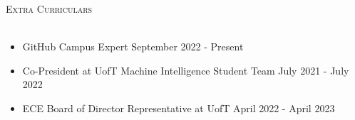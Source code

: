 \documentclass[a4paper]{article}
\newcommand{\lineunder} {
    \vspace*{-8pt} \\
    \hspace*{-18pt} \hrulefill \\
}
\newcommand{\header} [1] {
    {\hspace*{-18pt}\vspace*{6pt} \textsc{#1}}
    \vspace*{-6pt} \lineunder
}
\begin{document}

\vspace{1mm}
\header{Extra Curriculars}
\vspace{-3mm}
\begin{itemize} \itemsep 0.5pt
	\item \begin{small} GitHub Campus Expert \hfill September 2022 - Present \end{small}
	\vspace{-2mm}
    \item \begin{small} Co-President at UofT Machine Intelligence Student Team \hfill July 2021 - July 2022 \end{small}
	\vspace{-2mm}
    \item \begin{small} ECE Board of Director Representative at UofT \hfill April 2022 - April 2023 \end{small}
    \vspace{-2mm}
\end{itemize}
\end{document}
